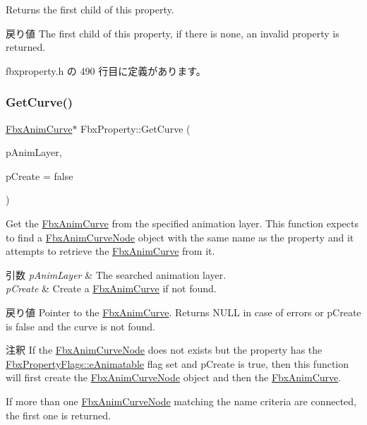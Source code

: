 Returns the first child of this property. \begin{DoxyReturn}{戻り値}
The first child of this property, if there is none, an invalid property is returned. 
\end{DoxyReturn}


 fbxproperty.\+h の 490 行目に定義があります。

\mbox{\label{class_fbx_property_a78b7ee36876a91b8689caae3117cbbb0}} 
\subsubsection{\texorpdfstring{Get\+Curve()}{GetCurve()}\hspace{0.1cm}{\footnotesize\ttfamily [1/3]}}
{\footnotesize\ttfamily \hyperlink{class_fbx_anim_curve}{Fbx\+Anim\+Curve}$\ast$ Fbx\+Property\+::\+Get\+Curve (\begin{DoxyParamCaption}\item[{\hyperlink{class_fbx_anim_layer}{Fbx\+Anim\+Layer} $\ast$}]{p\+Anim\+Layer,  }\item[{bool}]{p\+Create = {\ttfamily false} }\end{DoxyParamCaption})\hspace{0.3cm}{\ttfamily [inline]}}

Get the \hyperlink{class_fbx_anim_curve}{Fbx\+Anim\+Curve} from the specified animation layer. This function expects to find a \hyperlink{class_fbx_anim_curve_node}{Fbx\+Anim\+Curve\+Node} object with the same name as the property and it attempts to retrieve the \hyperlink{class_fbx_anim_curve}{Fbx\+Anim\+Curve} from it. 
\begin{DoxyParams}{引数}
{\em p\+Anim\+Layer} & The searched animation layer. \\
\hline
{\em p\+Create} & Create a \hyperlink{class_fbx_anim_curve}{Fbx\+Anim\+Curve} if not found. \\
\hline
\end{DoxyParams}
\begin{DoxyReturn}{戻り値}
Pointer to the \hyperlink{class_fbx_anim_curve}{Fbx\+Anim\+Curve}. Returns N\+U\+LL in case of errors or p\+Create is {\ttfamily false} and the curve is not found. 
\end{DoxyReturn}
\begin{DoxyRemark}{注釈}
If the \hyperlink{class_fbx_anim_curve_node}{Fbx\+Anim\+Curve\+Node} does not exists but the property has the \hyperlink{class_fbx_property_flags_afabfa7e0949aac8a7dcdf8a141867e99ae2c562a65bb942f3f94631794bc3d257}{Fbx\+Property\+Flags\+::e\+Animatable} flag set and p\+Create is true, then this function will first create the \hyperlink{class_fbx_anim_curve_node}{Fbx\+Anim\+Curve\+Node} object and then the \hyperlink{class_fbx_anim_curve}{Fbx\+Anim\+Curve}. 

If more than one \hyperlink{class_fbx_anim_curve_node}{Fbx\+Anim\+Curve\+Node} matching the name criteria are connected, the first one is returned. 
\end{DoxyRemark}


